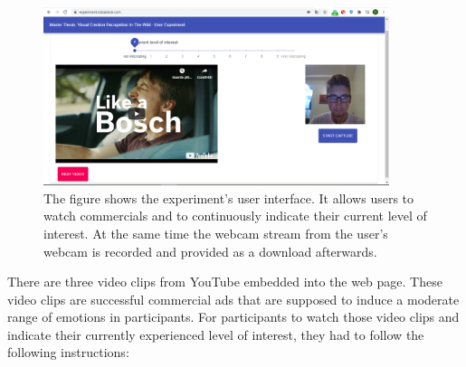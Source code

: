 \begin{center}
\begin{figure}[htbp]
  \begin{center}
  \includegraphics[angle=0, width=0.9\textwidth]{Figures/UserExperiment.PNG}
  \caption[Implemented UI for the user experiment]{The figure shows the experiment's user interface. It allows users to watch commercials and to continuously indicate their current level of interest. At the same time the webcam stream from the user's webcam is recorded and provided as a download afterwards.}
  \label{fig:InterfaceUserExperiment}
  \end{center}
\end{figure}
\end{center}

\noindent There are three video clips from YouTube embedded into the web page. These video clips are successful commercial ads that are supposed to induce a moderate range of emotions in participants.
\newline\newline
For participants to watch those video clips and indicate their currently experienced level of interest, they had to follow the following instructions:

